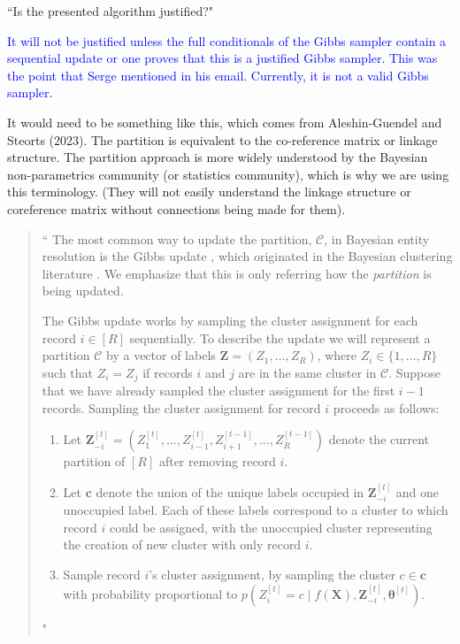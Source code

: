 \documentclass{article}
\newcommand{\bX}{\boldsymbol X}
\newcommand{\bZ}{ \boldsymbol Z}
\newcommand{\bc}{\boldsymbol c}
\newcommand{\btheta}{\boldsymbol \theta}
\newcommand{\C}{\mathcal{C}}
\begin{document}
\begin{enumerate}
``Is the presented algorithm justified?"

\textcolor{blue}{It will not be justified unless the full conditionals of the Gibbs sampler contain a sequential update or one proves that this is a justified Gibbs sampler. This was the point that Serge mentioned in his email. Currently, it is not a valid Gibbs sampler.}

It would need to be something like this, which comes from Aleshin-Guendel and Steorts (2023). The partition is equivalent to the co-reference matrix or linkage structure. The partition approach is more widely understood by the Bayesian non-parametrics community (or statistics community), which is why we are using this terminology. (They will not easily understand the linkage structure or coreference matrix without connections being made for them).

\begin{quote}
			`` The most common way to update the partition, $\C$, in Bayesian entity resolution is the Gibbs update \citep{Sadinle_2014, Steorts_2015, Sadinle_2017, Tancredi_2020, Marchant_2021, Aleshin-Guendel_2022, Marchant_2023}, which originated in the Bayesian clustering literature \citep[see e.g.][]{Neal_2000}.
			 We emphasize that this is only referring how the \textit{partition} is being updated. 
			 
The Gibbs update works by sampling the cluster assignment for each record $i \in [R]$ sequentially. To describe the update we will represent a partition $\C$ by a  vector of labels $\bZ=(Z_1,\dots, Z_R)$, where $Z_i\in\{1,\dots, R\}$ such that $Z_i=Z_j$ if records $i$ and $j$ are in the same cluster in $\C$. Suppose that we have already sampled the cluster assignment for the first $i-1$ records. Sampling the cluster assignment for record $i$ proceeds as follows:
			\begin{enumerate}
				\item Let $\bZ^{[t]}_{-i}=(Z_1^{[t]},\dots,Z_{i-1}^{[t]},Z_{i+1}^{[t-1]},\dots, Z_R^{[t-1]})$ denote the current partition of $[R]$ after removing record $i$. 
				\item Let $\bc$ denote the union of the unique labels occupied in $\bZ^{[t]}_{-i}$ and one unoccupied label. Each of these labels correspond to a cluster to which record $i$ could be assigned, with the unoccupied cluster representing the creation of new cluster with only record $i$.
				\item Sample record $i$'s cluster assignment, by sampling the cluster $c\in \bc$ with probability proportional to $p(Z_{i}^{[t]}=c\mid f(\bX), \bZ^{[t]}_{-i}, \btheta^{[t]})$.
			\end{enumerate}
			"


\end{quote}
\end{enumerate}
\end{document}
